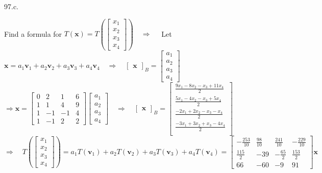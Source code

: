 \documentclass[12pt]{book}
\begin{document}
\begin{CJK}{UTF8}{bsmi}
97.c. \begin{minipage}[t]{\dimexpr\linewidth-2em}
Find a formula for $T(\textbf{x})=T\left(\begin{bmatrix}
x_1\\x_2\\x_3\\x_4
\end{bmatrix}\right)\quad\Rightarrow\quad$ Let $\textbf{x}=a_1\textbf{v}_1+a_2\textbf{v}_2+a_3\textbf{v}_3+a_4\textbf{v}_4\quad\Rightarrow\quad\begin{bmatrix}
\textbf{x}
\end{bmatrix}_B=\begin{bmatrix}
a_1\\a_2\\a_3\\a_4
\end{bmatrix}$ \\
$\Rightarrow\textbf{x}=\begin{bmatrix}
0&2&1&6\\
1&1&4&9\\
1&-1&-1&4\\
1&-1&2&2
\end{bmatrix}\begin{bmatrix}
a_1\\a_2\\a_3\\a_4
\end{bmatrix}\quad\Rightarrow\quad\begin{bmatrix}
\textbf{x}
\end{bmatrix}_B=\begin{bmatrix}
\frac{9x_1-8x_2-x_3+11x_4}{2} \\
\frac{5x_1-4x_2-x_3+5x_4}{2} \\
\frac{-2x_1+2x_2-x_3-x_4}{2} \\
\frac{-3x_1+3x_2+x_3-4x_4}{2} \\
\end{bmatrix}$ \\
$\Rightarrow\quad T\left(\begin{bmatrix}
x_1\\x_2\\x_3\\x_4
\end{bmatrix}\right)=a_1T(\textbf{v}_1)+a_2T(\textbf{v}_2)+a_3T(\textbf{v}_3)+a_4T(\textbf{v}_4)=\begin{bmatrix}
-\frac{253}{10} & \frac{98}{10} & \frac{241}{10} & -\frac{229}{10} \\
\frac{115}{2} & -39 & -\frac{65}{2} & \frac{153}{2} \\
66 & -60 & -9 & 91
\end{bmatrix}\textbf{x}$
\end{minipage}\\


\end{CJK}
\end{document}
